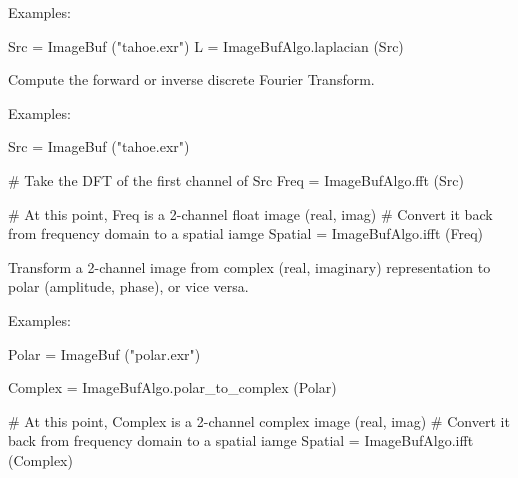 \smallskip
\noindent Examples:
\begin{code}
    Src = ImageBuf ("tahoe.exr")
    L = ImageBufAlgo.laplacian (Src)
\end{code}
\apiend


 
 

Compute the forward or inverse discrete Fourier Transform.

\smallskip
\noindent Examples:
\begin{code}
    Src = ImageBuf ("tahoe.exr")

    # Take the DFT of the first channel of Src
    Freq = ImageBufAlgo.fft (Src)

    # At this point, Freq is a 2-channel float image (real, imag)
    # Convert it back from frequency domain to a spatial iamge
    Spatial = ImageBufAlgo.ifft (Freq)
\end{code}
\apiend


 
 

Transform a 2-channel image from complex (real, imaginary) representation
to polar (amplitude, phase), or vice versa.

\smallskip
\noindent Examples:
\begin{code}
    Polar = ImageBuf ("polar.exr")

    Complex = ImageBufAlgo.polar_to_complex (Polar)

    # At this point, Complex is a 2-channel complex image (real, imag)
    # Convert it back from frequency domain to a spatial iamge
    Spatial = ImageBufAlgo.ifft (Complex)
\end{code}
\apiend



